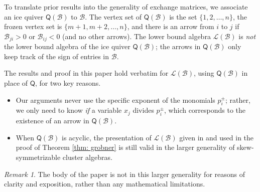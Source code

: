 \documentclass[10pt]{amsart}
\numberwithin{equation}{section}
\theoremstyle{definition}
\newtheorem{ex}[thm]{Example}
\theoremstyle{remark}
\newtheorem{rem}[thm]{Remark}
\newcommand{\B}{\mathcal{B}}
\renewcommand{\L}{\mathcal{L}}%
\newcommand{\1}{^{-1}}
\def\Q{\mathsf{Q}}
\begin{document}
%

To translate prior results into the generality of exchange matrices, we associate an ice quiver $\Q(\B)$ to $\B$.  The vertex set of $\Q(\B)$ is the set $\{1,2,\dots,n\}$, the frozen vertex set is $\{m+1,m+2,\dots,n\}$, and there is an arrow from $i$ to $j$ if $\B_{ji}>0$ or $\B_{ij}<0$ (and no other arrows).  The lower bound algebra $\L(\B)$ is \emph{not} the lower bound algebra of the ice quiver $\Q(\B)$; the arrows in $\Q(\B)$ only keep track of the sign of entries in $\B$.

The results and proof in this paper hold verbatim for $\L(\B)$, using $\Q(\B)$ in place of $\Q$, for two key reasons.
\begin{itemize}
	\item Our arguments never use the specific exponent of the monomials $p_i^\pm$; rather, we only need to know \emph{if} a variable $x_j$ divides $p_i^\pm$, which corresponds to the existence of an arrow in $\Q(\B)$.
	\item When $\Q(\B)$ is acyclic, the presentation of $\L(\B)$ given in \cite[Corollary 1.17]{BFZ05} and used in the proof of Theorem \ref{thm: grobner} is still valid in the larger generality of skew-symmetrizable cluster algebras.
\end{itemize}

\begin{rem}
The body of the paper is not in this larger generality for reasons of clarity and exposition, rather than any mathematical limitations.
\end{rem}
\end{document}
